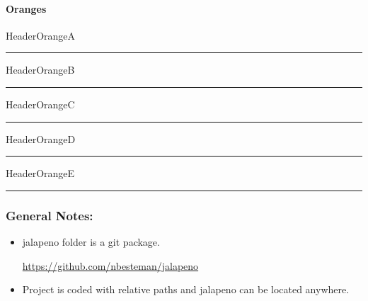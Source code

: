 \documentclass[class=book , crop=false]{standalone}
\begin{document}
\paragraph[Oranges]{Oranges\texorpdfstring{\\}{}}
\textcolor{HeaderOrangeA}{HeaderOrangeA}
\noindent\textcolor{HeaderOrangeA}{\rule{.5\textwidth}{.5mm}}
\textcolor{HeaderOrangeB}{HeaderOrangeB}
\noindent\textcolor{HeaderOrangeB}{\rule{.5\textwidth}{.5mm}}
\textcolor{HeaderOrangeC}{HeaderOrangeC}
\noindent\textcolor{HeaderOrangeC}{\rule{.5\textwidth}{.5mm}}
\textcolor{HeaderOrangeD}{HeaderOrangeD}
\noindent\textcolor{HeaderOrangeD}{\rule{.5\textwidth}{.5mm}}
\textcolor{HeaderOrangeE}{HeaderOrangeE}
\noindent\textcolor{HeaderOrangeE}{\rule{.5\textwidth}{.5mm}}
%

\clearpage
\subsubsection{General Notes:}
\begin{itemize}
\item jalapeno folder is a git package.

\href{https://github.com/nbesteman/jalapeno}{https://github.com/nbesteman/jalapeno}

\item Project is coded with relative paths and jalapeno can be located anywhere.

\end{itemize}
\end{document}
